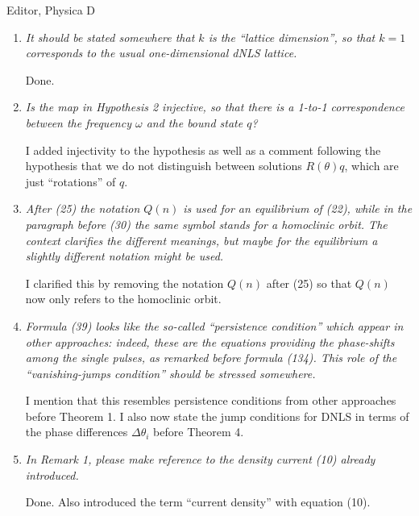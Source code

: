 \documentclass[11pt]{letter}
\begin{document}
\begin{letter}{Editor, Physica D}
\begin{enumerate}
\item \emph{It should be stated somewhere that $k$ is the ``lattice dimension'', so that $k = 1$ corresponds to the usual one-dimensional dNLS lattice. }

\vspace{4mm}
Done.
\vspace{4mm}

\item \emph{Is the map in Hypothesis 2 injective, so that there is a 1-to-1 correspondence between the frequency $\omega$ and the bound state $q$?}

\vspace{4mm}
I added injectivity to the hypothesis as well as a comment following the hypothesis that we do not distinguish between solutions $R(\theta)q$, which are just ``rotations'' of $q$.
\vspace{4mm}

\item \emph{After (25) the notation $Q(n)$ is used for an equilibrium of (22), while in the paragraph before (30) the same symbol stands for a homoclinic orbit. The context clarifies the different meanings, but maybe for the equilibrium a slightly different notation might be used.}

\vspace{4mm}
I clarified this by removing the notation $Q(n)$ after (25) so that $Q(n)$ now only refers to the homoclinic orbit.
\vspace{4mm}

\item \emph{Formula (39) looks like the so-called ``persistence condition'' which appear in other approaches: indeed, these are the equations providing the phase-shifts among the single pulses, as remarked before formula (134). This role of the ``vanishing-jumps condition'' should be stressed somewhere.}

\vspace{4mm}
I mention that this resembles persistence conditions from other approaches before Theorem 1. I also now state the jump conditions for DNLS in terms of the phase differences $\Delta \theta_i$ before Theorem 4.
\vspace{4mm}

\item \emph{In Remark 1, please make reference to the density current (10) already introduced.}

\vspace{4mm}
Done. Also introduced the term ``current density'' with equation (10).
\vspace{4mm}


\end{enumerate}
\end{letter}
\end{document}
